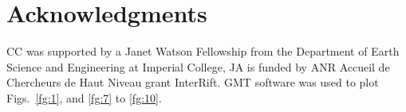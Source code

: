 \documentclass[a4paper,10pt,twocolumn]{paper}
\begin{document}

\section*{Acknowledgments}
CC was supported by a Janet Watson Fellowship from the Department of Earth Science and Engineering at Imperial College, JA is funded by ANR Accueil de Chercheurs de Haut Niveau grant InterRift. GMT \citep{wessel-1995} software was used to plot Figs.~\ref{fg:1}, and \ref{fg:7} to \ref{fg:10}.


\end{document}

